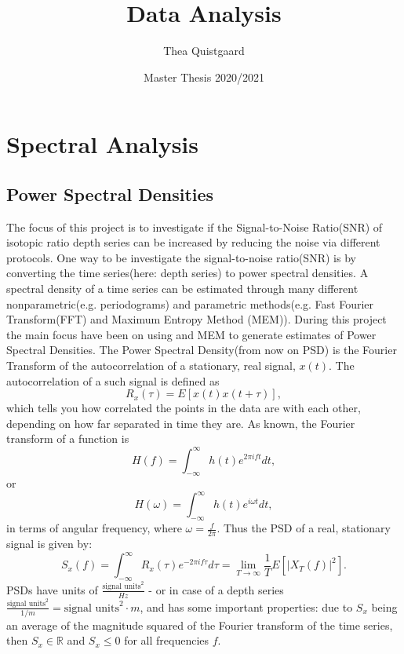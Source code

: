 \documentclass[11pt]{article}
\title{Data Analysis}
\author{Thea Quistgaard}
\date{Master Thesis 2020/2021}
\begin{document}
\maketitle
\section{Spectral Analysis}

\subsection{Power Spectral Densities}
The focus of this project is to investigate if the Signal-to-Noise Ratio(SNR) of isotopic ratio depth series can be increased by reducing the noise via different protocols.
One way to be investigate the signal-to-noise ratio(SNR) is by converting the time series(here: depth series) to power spectral densities. A spectral density of a time series can be estimated through many different nonparametric(e.g. periodograms) and parametric methods(e.g. Fast Fourier Transform(FFT) and Maximum Entropy Method (MEM)). During this project the main focus have been on using and MEM\cite{MEMSpectralAnalysis}\cite{BurgMEM} to generate estimates of Power Spectral Densities.	
The Power Spectral Density(from now on PSD) is the Fourier Transform of the autocorrelation of a stationary, real signal, $x(t)$.
The autocorrelation of a such signal is defined as 
\begin{equation}
	R_x(\tau) = E[x(t)x(t+\tau)],
\end{equation}
which tells you how correlated the points in the data are with each other, depending on how far separated in time they are. 
As known, the Fourier transform of a function is 
\begin{equation}
	H(f) = \int_{-\infty}^{\infty} h(t)e^{2\pi i f t} dt,
\end{equation}
or 
\begin{equation}
	H(\omega) = \int_{-\infty}^{\infty} h(t)e^{i \omega t} dt,
\end{equation}
in terms of angular frequency, where $\omega = \frac{f}{2\pi}$.
Thus the PSD of a real, stationary signal is given by:
\begin{equation}
	S_x(f) = \int_{-\infty}^{\infty}R_x(\tau)e^{-2\pi i f \tau}d \tau = \lim_{T \rightarrow \infty} \frac{1}{T} E[|X_T(f)|^2].
\end{equation}
PSDs have units of $\frac{\text{signal units}^2}{Hz}$ - or in case of a depth series $\frac{\text{signal units}^2}{1/m} = \text{signal units}^2\cdot m$, and has some important properties: due to $S_x$ being an average of the magnitude squared of the Fourier transform of the time series, then $S_x \in \mathbb{R}$ and $S_x \leq 0$ for all frequencies $f$. 
\end{document}
